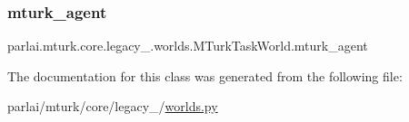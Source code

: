\subsubsection{\texorpdfstring{mturk\+\_\+agent}{mturk\_agent}}
{\footnotesize\ttfamily parlai.\+mturk.\+core.\+legacy\+\_.\+worlds.\+M\+Turk\+Task\+World.\+mturk\+\_\+agent}



The documentation for this class was generated from the following file\+:\begin{DoxyCompactItemize}
\item 
parlai/mturk/core/legacy\+\_/\hyperlink{parlai_2mturk_2core_2legacy__2018_2worlds_8py}{worlds.\+py}\end{DoxyCompactItemize}

